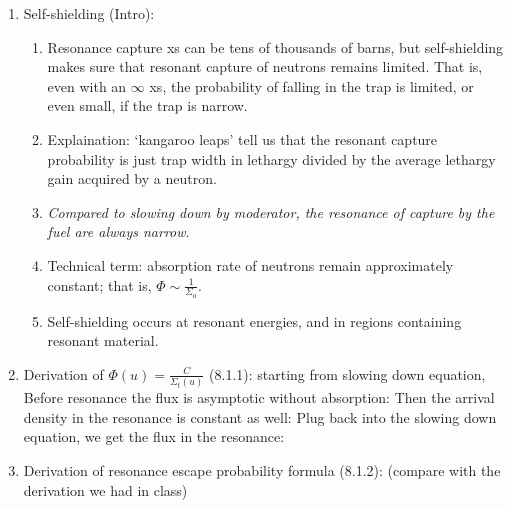 \documentclass{school-22.211-notes}
\date{February 27, 2012}
\begin{document}
\maketitle

\begin{enumerate}
\item Self-shielding (Intro): 
  \begin{enumerate}
  \item Resonance capture xs can be tens of thousands of barns, but self-shielding makes sure that resonant capture of neutrons remains limited. That is, even with an $\infty$ xs, the probability of falling in the trap is limited, or even small, if the trap is narrow. 
  \item Explaination: `kangaroo leaps' tell us that the resonant capture probability is just trap width in lethargy divided by the average lethargy gain acquired by a neutron. 
  \item \textit{Compared to slowing down by moderator, the resonance of capture by the fuel are always narrow}.
  \item Technical term: absorption rate of neutrons remain approximately constant; that is, $\Phi \sim \frac{1}{\Sigma_a}$. 
  \item Self-shielding occurs at resonant energies, and in regions containing resonant material. 
  \end{enumerate}
\item Derivation of $\Phi(u)  = \frac{C}{\Sigma_t(u)}$ (8.1.1): starting from slowing down equation,
  Before resonance the flux is asymptotic without absorption:
  Then the arrival density in the resonance is constant as well:
  Plug back into the slowing down equation, we get the flux in the resonance:
\item Derivation of resonance escape probability formula (8.1.2): 
(compare with the derivation we had in class)

\end{enumerate}
\end{document}
